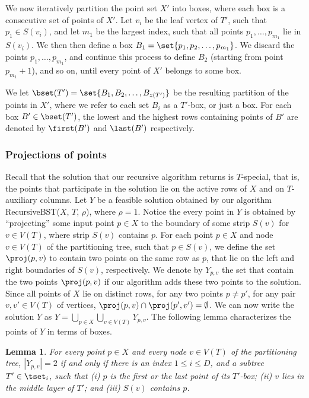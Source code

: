 \documentclass[11pt]{article}
\numberwithin{equation}{section}
\newtheorem{lemma}[theorem]{Lemma}
\theoremstyle{definition}
\theoremstyle{plain}
\begin{document}
We now iteratively partition the point set $X'$ into boxes, where each box is a consecutive set of points of $X'$. 
Let $v_i$ be the leaf vertex of $T'$, such that $p_1\in S(v_i)$, and let $m_1$ be the largest index, such that all points $p_1,\ldots,p_{m_1}$ lie in $S(v_i)$. We then then define a box $B_1 = \set{p_1, p_2,\ldots, p_{m_1}}$. We discard the points $p_1,\ldots,p_{m_1}$, and continue this process to define $B_2$ (starting from point $p_{m_1}+1$), and so on, until every point of $X'$ belongs to some box.

%
%

We let $\bset(T') = \set{B_1,B_2,\ldots, B_{z(T')}}$ be the resulting partition of the points in $X'$, where we refer to each set $B_i$ as a $T'$-box, or just a box.
For each box $B' \in \bset(T')$, the lowest and the highest rows containing points of $B'$ are denoted by $\first(B')$ and $\last(B')$ respectively.
 


\subsubsection{Projections of points} 

Recall that the solution that our recursive algorithm returns is $T$-special, that is, the points that participate in the solution lie on the active rows of $X$ and on $T$-auxiliary columns. 
Let $Y$ be a feasible solution obtained by our algorithm {\sc RecursiveBST}($X$, $T$, $\rho$), where $\rho=1$. 
Notice the every point in $Y$ is obtained by ``projecting'' some input point $p \in X$ to the boundary of some strip $S(v)$ for $v \in V(T)$, where strip $S(v)$ contains $p$.  
For each point $p \in X$ and node $v \in V(T)$ of the partitioning tree, such that $p \in S(v)$, we define the set $\proj(p,v)$ to contain two points on the same row as $p$, that lie on the left and right boundaries of $S(v)$, respectively.
We denote by $Y_{p,v}$ the set that contain the two points $\proj(p,v)$ if  our algorithm adds these two points to the solution. Since all points of $X$ lie on distinct rows, for any two points $p\neq p'$, for any pair $v,v'\in V(T)$ of vertices, $\proj(p,v)\cap \proj(p',v')=\emptyset$.
We can now write the solution $Y$ as $Y = \bigcup_{p \in X} \bigcup_{v \in V(T)} Y_{p,v}$.   
%
%
%
The following lemma characterizes the points of $Y$ in terms of boxes.  

\begin{lemma} 
For every point $p \in X$ and every node $v \in V(T)$ of the partitioning tree, $|Y_{p,v}| =2$ if and only if there is an index $1\leq i\leq D$, and a subtree $T' \in \tset_i$, such that (i) $p$ is the first or the last point of its $T'$-box; (ii) $v$ lies in the middle layer of $T'$; and (iii) $S(v)$ contains $p$.
\end{lemma} 
\end{document}
